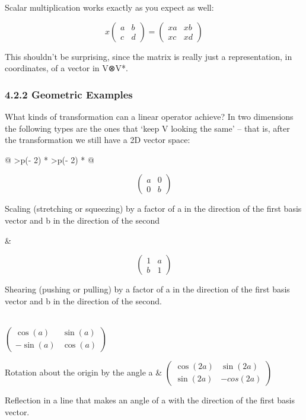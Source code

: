 \documentclass[oneside,english]{amsbook}
\numberwithin{section}{chapter}
\theoremstyle{plain}
\theoremstyle{definition}
\begin{document}
Scalar multiplication works exactly as you expect as well:

\[x\begin{pmatrix}
	a & b \\
	c & d
\end{pmatrix} = \begin{pmatrix}
	xa & xb \\
	xc & xd
\end{pmatrix}\]

This shouldn't be surprising, since the matrix is really just a
representation, in coordinates, of a vector in V⊗V*.

\subsubsection{4.2.2 Geometric Examples}\label{geometric-examples}

What kinds of transformation can a linear operator achieve? In two
dimensions the following types are the ones that `keep V looking the
same' -- that is, after the transformation we still have a 2D vector
space:

\begin{longtable}[]{@{}
		>{\centering\arraybackslash}p{}
		>{\centering\arraybackslash}p{}@{}}
	\toprule\noalign{}
	\begin{minipage}[b]{\linewidth}\centering
		\[\begin{pmatrix}
			a & 0 \\
			0 & b
		\end{pmatrix}\]
		
		Scaling (stretching or squeezing) by a factor of a in the direction of
		the first basis vector and b in the direction of the second
	\end{minipage} & \begin{minipage}[b]{\linewidth}\centering
		\[\begin{pmatrix}
			1 & a \\
			b & 1
		\end{pmatrix}\]
		
		Shearing (pushing or pulling) by a factor of a in the direction of the
		first basis vector and b in the direction of the second.
	\end{minipage} \\
	\midrule\noalign{}
	\endhead
	\bottomrule\noalign{}
	\endlastfoot
	\(\begin{pmatrix}
		\cos{(a)} & \sin{(a)} \\
		- \sin{(a)} & \cos{(a)}
	\end{pmatrix}\)
	
	Rotation about the origin by the angle a & \(\begin{pmatrix}
		\cos{(2a)} & \sin{(2a)} \\
		\sin{(2a)} & {- cos}{(2a)}
	\end{pmatrix}\)
	
	Reflection in a line that makes an angle of a with the direction of the
	first basis vector. \\
\end{longtable}
\end{document}
